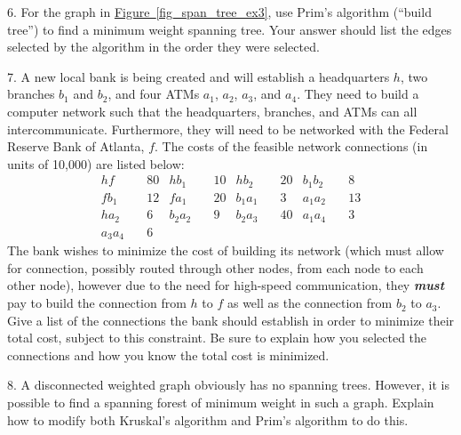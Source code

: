 \documentclass[10pt,]{book}
\newcommand{\alert}[1]{\textbf{\textit{#1}}}
\theoremstyle{plain}
\theoremstyle{definition}
\theoremstyle{definition}
\theoremstyle{definition}
\theoremstyle{definition}
\numberwithin{equation}{section}
\newcommand{\amp}{&}
\begin{document}
\begin{exerciselist}
\begin{figure}
\end{figure}
\par\smallskip
\item[6.]\hypertarget{exercise-18}{}\hypertarget{p-260}{}%
For the graph in \hyperref[fig_span_tree_ex3]{Figure~\ref{fig_span_tree_ex3}}, use Prim's algorithm (``build tree'') to find a minimum weight spanning tree. Your answer should list the edges selected by the algorithm in the order they were selected.%
\par\smallskip
\item[7.]\hypertarget{exercise-19}{}\hypertarget{p-261}{}%
A new local bank is being created and will establish a headquarters \(h\), two branches \(b_1\) and \(b_2\), and four ATMs \(a_1\), \(a_2\), \(a_3\), and \(a_4\). They need to build a computer network such that the headquarters, branches, and ATMs can all intercommunicate. Furthermore, they will need to be networked with the Federal Reserve Bank of Atlanta, \(f\). The costs of the feasible network connections (in units of \textdollar{}10,000) are listed below:%
\begin{align*}
h f \amp  \quad 80 \amp 
h b_1 \amp  \quad 10\amp  h b_2 \amp  \quad 20\amp 
b_1 b_2 \amp  \quad 8\\
f b_1 \amp  \quad 12\amp 
f a_1 \amp  \quad 20\amp  b_1 a_1 \amp  \quad 3\amp 
a_1 a_2 \amp  \quad 13\\
h a_2 \amp  \quad 6\amp 
b_2 a_2 \amp  \quad 9\amp  b_2 a_3 \amp  \quad 40\amp 
a_1 a_4 \amp  \quad 3\\
a_3 a_4 \amp \quad 6
\end{align*}
The bank wishes to minimize the cost of building its network (which must allow for connection, possibly routed through other nodes, from each node to each other node), however due to the need for high-speed communication, they \alert{must} pay to build the connection from \(h\) to \(f\) as well as the connection from \(b_2\) to \(a_3\). Give a list of the connections the bank should establish in order to minimize their total cost, subject to this constraint. Be sure to explain how you selected the connections and how you know the total cost is minimized.%
\par\smallskip
\item[8.]\hypertarget{exercise-20}{}\hypertarget{p-262}{}%
A disconnected weighted graph obviously has no spanning trees. However, it is possible to find a spanning forest of minimum weight in such a graph. Explain how to modify both Kruskal's algorithm and Prim's algorithm to do this.%
\par\smallskip

\end{exerciselist}
\end{document}
